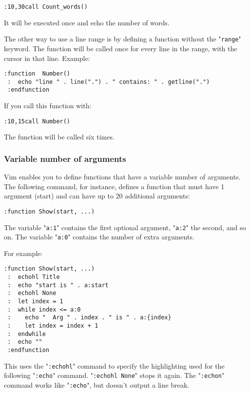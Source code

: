 \begin{Verbatim}[samepage=true]
 :10,30call Count_words()
\end{Verbatim}

It will be executed once and echo the number of words.

The other way to use a line range is by defining a function without the "\verb!range!" keyword.
The function will be called once for every line in the range, with the cursor in that line.
Example:

\begin{Verbatim}[samepage=true]
 :function  Number()
 :  echo "line " . line(".") . " contains: " . getline(".")
 :endfunction
\end{Verbatim}

If you call this function with:

\begin{Verbatim}[samepage=true]
 :10,15call Number()
\end{Verbatim}

The function will be called six times.
\subsubsection{Variable number of arguments}
Vim enables you to define functions that have a variable number of arguments.
The following command, for instance, defines a function that must have 1 argument (start) and can have up to 20 additional arguments:

\begin{Verbatim}[samepage=true]
 :function Show(start, ...)
\end{Verbatim}

The variable "\verb!a:1!" contains the first optional argument, "\verb!a:2!" the second, and so on.
The variable "\verb!a:0!" contains the number of extra arguments.

For example:

\begin{Verbatim}[samepage=true]
 :function Show(start, ...)
 :  echohl Title
 :  echo "start is " . a:start
 :  echohl None
 :  let index = 1
 :  while index <= a:0
 :    echo "  Arg " . index . " is " . a:{index}
 :    let index = index + 1
 :  endwhile
 :  echo ""
 :endfunction
\end{Verbatim}

This uses the "\verb!:echohl!" command to specify the highlighting used for the following "\verb!:echo!" command.
"\verb!:echohl None!" stops it again.
The "\verb!:echon!" command works like "\verb!:echo!", but doesn't output a line break.

